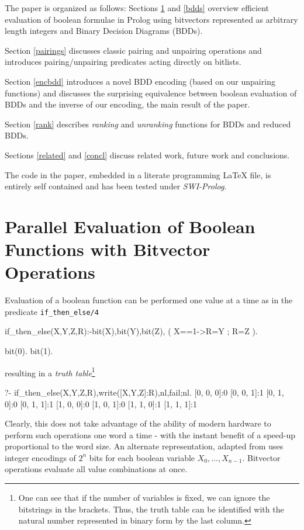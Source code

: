 \documentclass[]{INCLUDES/llncs}
\begin{document}
The paper is organized as follows:
Sections \ref{bits} and \ref{bdds} overview efficient evaluation of boolean
formulae in Prolog using bitvectors represented as arbitrary length integers
and Binary Decision Diagrams (BDDs).
 
Section \ref{pairings} discusses classic pairing and unpairing
operations and introduces pairing/unpairing
predicates acting directly on bitlists.

Section \ref{encbdd} introduces a novel BDD encoding (based on our unpairing
functions) and discusses the surprising equivalence between boolean evaluation of BDDs
and the inverse of our encoding, the main result of the paper.

Section \ref{rank} describes {\em ranking} and {\em unranking}
functions for BDDs and reduced BDDs.

Sections \ref{related} and \ref{concl} discuss related work, 
future work and conclusions.

The code in the paper, embedded in a literate programming LaTeX
file, is entirely self contained and has been tested under {\em SWI-Prolog}.

\section{Parallel Evaluation of Boolean 
Functions with Bitvector Operations}\label{bits}

Evaluation of a boolean function can be performed one 
value at a time as in the predicate {\tt if\_then\_else/4}
\begin{code}
if_then_else(X,Y,Z,R):-bit(X),bit(Y),bit(Z),
  ( X==1->R=Y
  ; R=Z
  ).

bit(0).
bit(1).
\end{code}
\noindent resulting in a {\em truth table}\footnote{One can see that if the
number of variables is fixed, we can ignore the bitstrings in the brackets.
Thus, the truth table can be identified with the natural number represented in
binary form by the last column.}
\begin{codex}
?- if_then_else(X,Y,Z,R),write([X,Y,Z]:R),nl,fail;nl.
[0, 0, 0]:0
[0, 0, 1]:1
[0, 1, 0]:0
[0, 1, 1]:1
[1, 0, 0]:0
[1, 0, 1]:0
[1, 1, 0]:1
[1, 1, 1]:1
\end{codex}
Clearly, this does not take advantage of the ability of modern hardware to
perform such operations one word a time - with the instant benefit of a
speed-up proportional to the word size.
An alternate representation, adapted
from \cite{knuth06draft} uses integer encodings 
of $2^n$ bits for each boolean variable $X_0,\ldots,X_{n-1}$. 
Bitvector operations evaluate all
value combinations at once.
\end{document}
